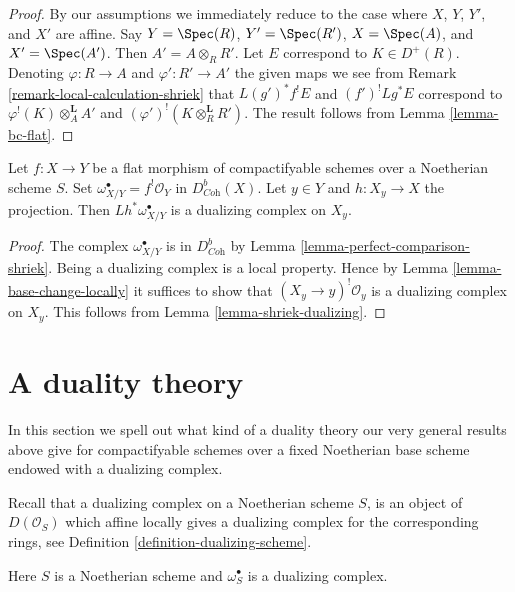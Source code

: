 \begin{proof}
By our assumptions we immediately reduce to the case where
$X$, $Y$, $Y'$, and $X'$ are affine.
Say $Y = \Spec(R)$, $Y' = \Spec(R')$, $X = \Spec(A)$, and $X' = \Spec(A')$.
Then $A' = A \otimes_R R'$. Let
$E$ correspond to $K \in D^+(R)$.
Denoting $\varphi : R \to A$ and $\varphi' : R' \to A'$
the given maps we see from
Remark \ref{remark-local-calculation-shriek}
that $L(g')^*f^!E$ and $(f')^!Lg^*E$ correspond to
$\varphi^!(K) \otimes_A^\mathbf{L} A'$ and
$(\varphi')^!(K \otimes_R^\mathbf{L} R')$.
The result follows from
Lemma \ref{lemma-bc-flat}.
\end{proof}

\begin{lemma}
\label{lemma-relative-dualizing-fibres}
Let $f : X \to Y$ be a flat morphism of compactifyable schemes over
a Noetherian scheme $S$. Set
$\omega_{X/Y}^\bullet = f^!\mathcal{O}_Y$ in $D^b_{\textit{Coh}}(X)$.
Let $y \in Y$ and $h : X_y \to X$ the projection.
Then $Lh^*\omega_{X/Y}^\bullet$ is a dualizing complex
on $X_y$.
\end{lemma}

\begin{proof}
The complex $\omega_{X/Y}^\bullet$ is in $D^b_{\textit{Coh}}$
by Lemma \ref{lemma-perfect-comparison-shriek}.
Being a dualizing complex is a local property.
Hence by Lemma \ref{lemma-base-change-locally}
it suffices to show that $(X_y \to y)^!\mathcal{O}_y$
is a dualizing complex on $X_y$.
This follows from Lemma \ref{lemma-shriek-dualizing}.
\end{proof}








\section{A duality theory}
\label{section-duality}

\noindent
In this section we spell out what kind of a duality theory
our very general results above give for compactifyable schemes
over a fixed Noetherian base scheme endowed with a dualizing complex.

\medskip\noindent
Recall that a dualizing complex on a Noetherian scheme $S$, is an
object of $D(\mathcal{O}_S)$ which affine locally gives a dualizing
complex for the corresponding rings, see
Definition \ref{definition-dualizing-scheme}.

\begin{situation}
\label{situation-dualizing}
Here $S$ is a Noetherian scheme and $\omega_S^\bullet$ is a dualizing
complex.
\end{situation}

